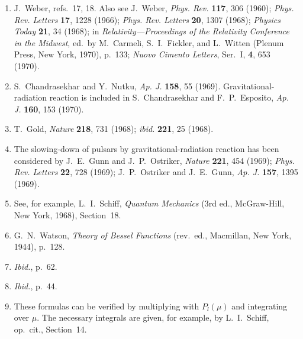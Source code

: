 \begin{enumerate}
  \item {}\label{ch10-ref-1}
  J.~Weber, refs.~17, 18. Also see J.~Weber, \emph{Phys. Rev.}
  \textbf{117}, 306 (1960); \emph{Phys. Rev. Letters} \textbf{17}, 1228
  (1966); \emph{Phys. Rev. Letters} \textbf{20}, 1307 (1968);
  \emph{Physics Today} \textbf{21}, 34 (1968); in
  \emph{Relativity---Proceedings of the Relativity Conference in the
  Midwest}, ed.\ by M.~Carmeli, S.~I.~Fickler, and L.~Witten (Plenum Press,
  New York, 1970), p.~133; \emph{Nuovo Cimento Letters}, Ser.~I,
  \textbf{4}, 653 (1970).

  \item {}\label{ch10-ref-2}
  S.~Chandrasekhar and Y.~Nutku, \emph{Ap. J.} \textbf{158}, 55 (1969).
  Gravitational-radiation reaction is included in S.~Chandrasekhar and
  F.~P.~Esposito, \emph{Ap. J.} \textbf{160}, 153 (1970).

  \item {}\label{ch10-ref-3}
  T.~Gold, \emph{Nature} \textbf{218}, 731 (1968); \emph{ibid.}
  \textbf{221}, 25 (1968).

  \item {}\label{ch10-ref-4}
  The slowing-down of pulsars by gravitational-radiation reaction has been
  considered by J.~E.~Gunn and J.~P.~Ostriker, \emph{Nature} \textbf{221},
  454 (1969); \emph{Phys. Rev. Letters} \textbf{22}, 728 (1969);
  J.~P.~Ostriker and J.~E.~Gunn, \emph{Ap. J.} \textbf{157}, 1395 (1969).

  \item {}\label{ch10-ref-5}
  See, for example, L.~I.~Schiff, \emph{Quantum Mechanics} (3rd ed.,
  McGraw-Hill, New York, 1968), Section~18.

  \item {}\label{ch10-ref-6}
  G.~N.~Watson, \emph{Theory of Bessel Functions} (rev.\ ed., Macmillan,
  New York, 1944), p.~128.

  \item {}\label{ch10-ref-7}
  \emph{Ibid.}, p.~62.

  \item {}\label{ch10-ref-8}
  \emph{Ibid.}, p.~44.

  \item {}\label{ch10-ref-9}
  These formulas can be verified by multiplying with \(P_l(\mu)\) and
  integrating over \(\mu\). The necessary integrals are given, for example,
  by L.~I.~Schiff, op.\ cit., Section~14.


\end{enumerate}

